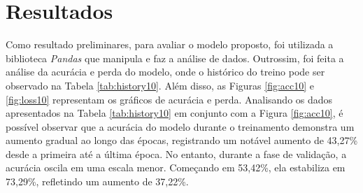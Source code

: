 
\section{\esp Resultados} \label{results}




Como resultado preliminares, para avaliar o modelo proposto, foi utilizada a biblioteca \textit{Pandas} que manipula e faz a análise de dados. Outrossim, foi feita a análise da acurácia e perda do modelo, onde o histórico do treino pode ser observado na Tabela \ref{tab:history10}. Além disso, as Figuras \ref{fig:acc10} e \ref{fig:loss10} representam os gráficos de acurácia e perda. Analisando os dados apresentados na Tabela \ref{tab:history10} em conjunto com a Figura \ref{fig:acc10}, é possível observar que a acurácia do modelo durante o treinamento demonstra um aumento gradual ao longo das épocas, registrando um notável aumento de 43,27\% desde a primeira até a última época. No entanto, durante a fase de validação, a acurácia oscila em uma escala menor. Começando em 53,42\%, ela estabiliza em 73,29\%, refletindo um aumento de 37,22\%.

